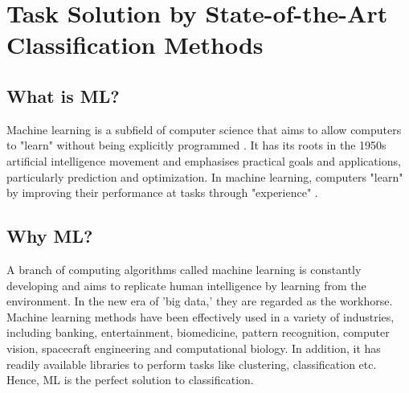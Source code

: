 \section{Task Solution by State-of-the-Art Classification Methods}
	\subsection{What is ML?}
	Machine learning is a subfield of computer science that aims to allow computers to "learn" without being explicitly programmed \cite{C0}. It has its roots in the 1950s artificial intelligence movement and emphasises practical goals and applications, particularly prediction and optimization. In machine learning, computers "learn" by improving their performance at tasks through "experience" \cite{C01}.
	\subsection{Why ML?}
	A branch of computing algorithms called machine learning is constantly developing and aims to replicate human intelligence by learning from the environment. In the new era of 'big data,' they are regarded as the workhorse. Machine learning methods have been effectively used in a variety of industries, including banking, entertainment, biomedicine, pattern recognition, computer vision, spacecraft engineering and computational biology. In addition, it has readily available libraries to perform tasks like clustering, classification etc. Hence, ML is the perfect solution to classification.\\
